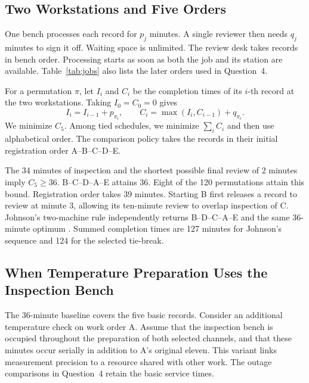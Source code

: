 \documentclass{swmcmthesis}
\begin{document}
\clearpage
\subsection{Two Workstations and Five Orders}
One bench processes each record for \(p_j\) minutes. A single reviewer then needs \(q_j\) minutes to sign it off. Waiting space is unlimited. The review desk takes records in bench order. Processing starts as soon as both the job and its station are available. Table~\ref{tab:jobs} also lists the later orders used in Question~4.
\begin{table}[H]\centering
\caption{Constructed service times. New records arrive only in the specified scenarios.}\label{tab:jobs}
\JobsTable
\end{table}
For a permutation \(\pi\), let \(I_i\) and \(C_i\) be the completion times of its \(i\)-th record at the two workstations. Taking \(I_0=C_0=0\) gives
\[
 I_i=I_{i-1}+p_{\pi_i},\qquad
 C_i=\max(I_i,C_{i-1})+q_{\pi_i}.
\]
We minimize \(C_5\). Among tied schedules, we minimize \(\sum_i C_i\) and then use alphabetical order. The comparison policy takes the records in their initial registration order A--B--C--D--E.
\begin{table}[H]\centering
\caption{Initial timelines of the two admissible queues, in minutes.}\label{tab:base}
\BaseTable
\end{table}
The 34 minutes of inspection and the shortest possible final review of 2 minutes imply \(C_5\geq36\). B--C--D--A--E attains 36. Eight of the 120 permutations attain this bound. Registration order takes 39 minutes. Starting B first releases a record to review at minute 3, allowing its ten-minute review to overlap inspection of C. Johnson's two-machine rule independently returns B--D--C--A--E and the same 36-minute optimum \cite{johnson}. Summed completion times are 127 minutes for Johnson's sequence and 124 for the selected tie-break.

\clearpage
\subsection{When Temperature Preparation Uses the Inspection Bench}
The 36-minute baseline covers the five basic records. Consider an additional temperature check on work order A. Assume that the inspection bench is occupied throughout the preparation of both selected channels, and that these minutes occur serially in addition to A's original eleven. This variant links measurement precision to a resource shared with other work. The outage comparisons in Question~4 retain the basic service times.
\end{document}

